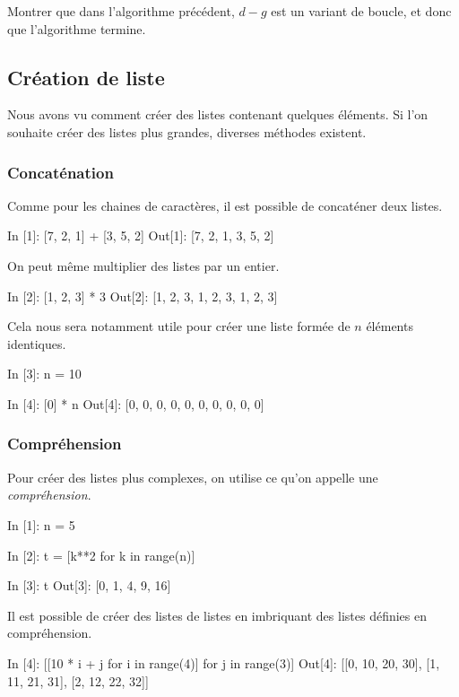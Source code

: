 \documentclass{magnolia}
\begin{document}
\begin{exoUnique}
\exo Montrer que dans l'algorithme précédent, $d-g$ est un variant de boucle, et donc que l'algorithme
  termine.
\end{exoUnique}

\subsection{Création de liste}

Nous avons vu comment créer des listes contenant quelques éléments.  Si l'on souhaite
créer des listes plus grandes, diverses méthodes existent.

\subsubsection{Concaténation}
Comme pour les chaines de caractères, il est possible de concaténer deux listes.

\begin{pythoncode}
In [1]: [7, 2, 1] + [3, 5, 2]
Out[1]: [7, 2, 1, 3, 5, 2]
\end{pythoncode}

\noindent
On peut même multiplier des listes par un entier.

\begin{pythoncode}
In [2]: [1, 2, 3] * 3
Out[2]: [1, 2, 3, 1, 2, 3, 1, 2, 3]
\end{pythoncode}

\noindent
Cela nous sera notamment utile pour créer une liste formée de $n$ éléments identiques.

\begin{pythoncode}
In [3]: n = 10

In [4]: [0] * n
Out[4]: [0, 0, 0, 0, 0, 0, 0, 0, 0, 0]
\end{pythoncode}

\subsubsection{Compréhension}
Pour créer des listes plus complexes, on utilise ce qu'on appelle une \emph{compréhension}.

\begin{pythoncode}
In [1]: n = 5

In [2]: t = [k**2 for k in range(n)]

In [3]: t
Out[3]: [0, 1, 4, 9, 16]   
\end{pythoncode}
\noindent
Il est possible de créer des listes de listes en imbriquant des listes définies en compréhension.
\begin{pythoncode}
In [4]: [[10 * i + j for i in range(4)] for j in range(3)]
Out[4]: [[0, 10, 20, 30], [1, 11, 21, 31], [2, 12, 22, 32]]
\end{pythoncode}
\end{document}
